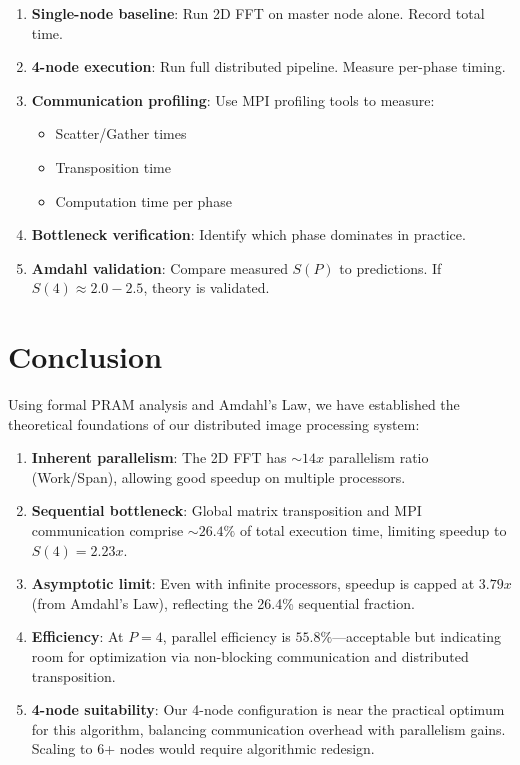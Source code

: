 \documentclass[11pt,a4paper]{article}
\theoremstyle{definition}
\begin{document}
\begin{enumerate}
    \item \textbf{Single-node baseline}: Run 2D FFT on master node alone. Record total time.
    \item \textbf{4-node execution}: Run full distributed pipeline. Measure per-phase timing.
    \item \textbf{Communication profiling}: Use MPI profiling tools to measure:
        \begin{itemize}
            \item Scatter/Gather times
            \item Transposition time
            \item Computation time per phase
        \end{itemize}
    \item \textbf{Bottleneck verification}: Identify which phase dominates in practice.
    \item \textbf{Amdahl validation}: Compare measured $S(P)$ to predictions. If $S(4) \approx 2.0-2.5$, theory is validated.
\end{enumerate}

\section{Conclusion}

Using formal PRAM analysis and Amdahl's Law, we have established the theoretical foundations of our distributed image processing system:

\begin{enumerate}
    \item \textbf{Inherent parallelism}: The 2D FFT has $\sim 14x$ parallelism ratio (Work/Span), allowing good speedup on multiple processors.
    
    \item \textbf{Sequential bottleneck}: Global matrix transposition and MPI communication comprise $\sim 26.4\%$ of total execution time, limiting speedup to $S(4) = 2.23x$.
    
    \item \textbf{Asymptotic limit}: Even with infinite processors, speedup is capped at $3.79x$ (from Amdahl's Law), reflecting the 26.4\% sequential fraction.
    
    \item \textbf{Efficiency}: At $P=4$, parallel efficiency is $55.8\%$—acceptable but indicating room for optimization via non-blocking communication and distributed transposition.
    
    \item \textbf{4-node suitability}: Our 4-node configuration is near the practical optimum for this algorithm, balancing communication overhead with parallelism gains. Scaling to 6+ nodes would require algorithmic redesign.
\end{enumerate}
\end{document}
